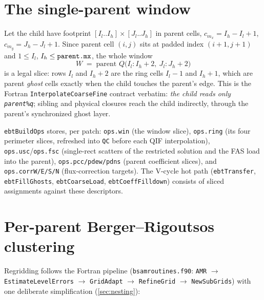 \documentclass[11pt,oneside,openany]{book}
\newcommand{\code}[1]{\textnormal{\texttt{#1}}}
\begin{document}
\section{The single-parent window}
\label{sec:window}

Let the child have footprint $[I_l..I_h]\times[J_l..J_h]$ in parent
cells, $c_{m_x}=I_h{-}I_l{+}1$, $c_{m_y}=J_h{-}J_l{+}1$.  Since parent
cell $(i,j)$ sits at padded index $(i{+}1, j{+}1)$ and $1\le I_l$,
$I_h\le \code{parent.mx}$, the whole window
\[
W \;=\; \text{parent }Q\bigl(I_l : I_h{+}2,\ J_l : J_h{+}2\bigr)
\]
is a legal slice: rows $I_l$ and $I_h{+}2$ are the ring cells
$I_l{-}1$ and $I_h{+}1$, which are parent \emph{ghost} cells exactly
when the child touches the parent's edge.  This is the Fortran
\code{InterpolateCoarseFine} contract verbatim: \emph{the child reads
only \code{parent\%q}}; sibling and physical closures reach the child
indirectly, through the parent's synchronized ghost layer.

\begin{codepath}
\code{ebtBuildOps} stores, per patch: \code{ops.win} (the window
slice), \code{ops.ring} (its four perimeter slices, refreshed into
\code{QC} before each QIF interpolation), \code{ops.usc}/\code{ops.fsc}
(single-rect scatters of the restricted solution and the FAS load into
the parent), \code{ops.pcc/pdew/pdns} (parent coefficient slices), and
\code{ops.corrW/E/S/N} (flux-correction targets).  The V-cycle hot path
(\code{ebtTransfer}, \code{ebtFillGhosts}, \code{ebtCoarseLoad},
\code{ebtCoeffFilldown}) consists of sliced assignments against these
descriptors.
\end{codepath}

\section{Per-parent Berger--Rigoutsos clustering}
\label{sec:perparent}

Regridding follows the Fortran pipeline
(\code{bsamroutines.f90}: \code{AMR} $\to$ \code{EstimateLevelErrors}
$\to$ \code{GridAdapt} $\to$ \code{RefineGrid} $\to$
\code{NewSubGrids}) with one deliberate simplification
(\cref{sec:nesting}):
\end{document}
